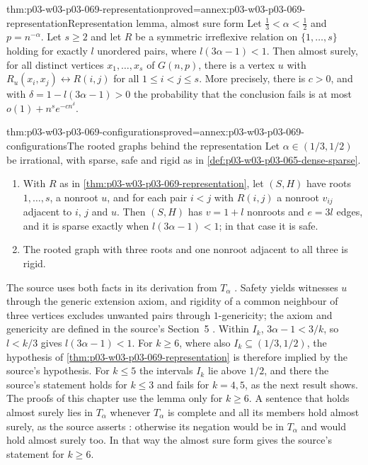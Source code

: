 \begin{hblemma}{thm:p03-w03-p03-069-representation}{proved=annex:p03-w03-p03-069-representation}{Representation lemma, almost sure form}
Let \(\tfrac13<\alpha<\tfrac12\) and \(p=n^{-\alpha}\).  Let \(s\geq2\) and
let \(R\) be a symmetric irreflexive relation on \(\{1,\ldots,s\}\) holding
for exactly \(l\) unordered pairs, where \(l(3\alpha-1)<1\).  Then almost
surely, for all distinct vertices \(x_1,\ldots,x_s\) of \(G(n,p)\), there is
a vertex \(u\) with
\(R_u(x_i,x_j)\leftrightarrow R(i,j)\) for all \(1\leq i<j\leq s\).
More precisely, there is \(c>0\), and with \(\delta=1-l(3\alpha-1)>0\) the
probability that the conclusion fails is at most
\(o(1)+n^se^{-cn^{\delta}}\).
\end{hblemma}

\begin{hblemma}{thm:p03-w03-p03-069-configurations}{proved=annex:p03-w03-p03-069-configurations}{The rooted graphs behind the representation}
Let \(\alpha\in(1/3,1/2)\) be irrational, with sparse, safe and rigid as in
\cref{def:p03-w03-p03-065-dense-sparse}.
\begin{enumerate}
\item With \(R\) as in \cref{thm:p03-w03-p03-069-representation}, let
\((S,H)\) have roots \(1,\ldots,s\), a nonroot \(u\), and for each pair
\(i<j\) with \(R(i,j)\) a nonroot \(v_{ij}\) adjacent to \(i\), \(j\) and
\(u\).  Then \((S,H)\) has \(v=1+l\) nonroots and \(e=3l\) edges, and it is
sparse exactly when \(l(3\alpha-1)<1\); in that case it is safe.
\item The rooted graph with three roots and one nonroot adjacent to all three
is rigid.
\end{enumerate}
\end{hblemma}

The source uses both facts in its derivation from \(T_\alpha\)
\cite[p.~17]{Spencer2007LogicRandomStructuresAuthor}.  Safety yields
witnesses \(u\) through the generic extension axiom, and rigidity of a common
neighbour of three vertices excludes unwanted pairs through
\(1\)-genericity; the axiom and genericity are defined in the source's
Section~5 \cite[p.~10]{Spencer2007LogicRandomStructuresAuthor}.  Within
\(I_k\), \(3\alpha-1<3/k\), so \(l<k/3\) gives \(l(3\alpha-1)<1\).  For
\(k\geq6\), where also \(I_k\subseteq(1/3,1/2)\), the hypothesis of
\cref{thm:p03-w03-p03-069-representation} is therefore implied by the
source's hypothesis.  For \(k\leq5\) the intervals \(I_k\) lie above \(1/2\),
and there the source's statement holds for \(k\leq3\) and fails for
\(k=4,5\), as the next result shows.  The proofs of this chapter use the
lemma only for \(k\geq6\).  A sentence that holds almost surely lies in
\(T_\alpha\) whenever \(T_\alpha\) is complete and all its members hold almost
surely, as the source asserts \cite[pp.~10--12]{Spencer2007LogicRandomStructuresAuthor}:
otherwise its negation would be in \(T_\alpha\) and would hold almost surely
too.  In that way the almost sure form gives the source's statement for
\(k\geq6\).


